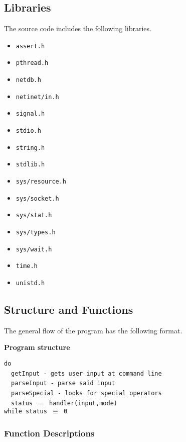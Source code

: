\documentclass[11pt,a4paper]{article}
\begin{document}
\subsection*{Libraries}

The source code includes the following libraries.

\begin{itemize}
\item \texttt{assert.h}
\item \texttt{pthread.h}
\item \texttt{netdb.h}
\item \texttt{netinet/in.h}
\item \texttt{signal.h}
\item \texttt{stdio.h}
\item \texttt{string.h}
\item \texttt{stdlib.h}
\item \texttt{sys/resource.h}
\item \texttt{sys/socket.h}
\item \texttt{sys/stat.h}
\item \texttt{sys/types.h}
\item \texttt{sys/wait.h}
\item \texttt{time.h}
\item \texttt{unistd.h}
\end{itemize}

\subsection*{Structure and Functions}

The general flow of the program has the following format.
\begin{description}
\item \textbf{Program structure}

\texttt{do}\\
~~\texttt{getInput - gets user input at command line}\\
~~\texttt{parseInput - parse said input}\\
~~\texttt{parseSpecial - looks for special operators}\\
~~\texttt{status $=$ handler(input,mode)}\\
\texttt{while status $\equiv$ 0}

\end{description}

\subsubsection*{Function Descriptions}
\end{document}
